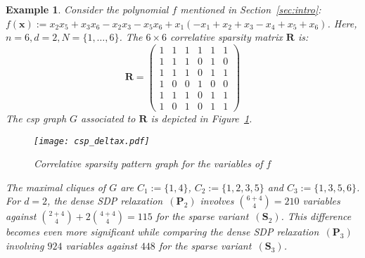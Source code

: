 \documentclass[preprint]{sigplanconf}
\newcommand{\x}{\mathbf{x}}
\def\P{\mathbf{P}}
\def\S{\mathbf{S}}
\def\S{\mathbf{S}}
\theoremstyle{plain}
\newtheorem{example}{Example}
\begin{document}
\begin{example}
\label{ex:sparse}
Consider the polynomial $f$ mentioned in Section~\ref{sec:intro}:
$f(\x) := x_2 x_5 + x_3 x_6 - x_2 x_3  - x_5 x_6 
+ x_1 ( - x_1 +  x_2 +  x_3  - x_4 +  x_5 +  x_6)$.
%
Here, $n = 6, d = 2, N = \{1,\dots, 6 \}$. The $6 \times 6$ correlative sparsity matrix $\mathbf{R}$ is:
\[
\mathbf{R} = 
\begin{pmatrix}
  1 & 1 & 1 & 1 & 1 & 1 \\
  1 & 1 & 1 & 0 & 1 & 0 \\
  1 & 1 & 1 & 0 & 1 & 1 \\
  1 & 0 & 0 & 1 & 0 & 0 \\
  1 & 1 & 1 & 0 & 1 & 1 \\
  1 & 0 & 1 & 0 & 1 & 1 
 \end{pmatrix}
\]
The csp graph $G$ associated to $\mathbf{R}$ is depicted in Figure~\ref{fig:csp_deltax}. 
%
\begin{figure}[!ht]	
\begin{center}
\texttt{[image: csp\_deltax.pdf]}
\caption{Correlative sparsity pattern graph for the variables of $f$}
\label{fig:csp_deltax}
\end{center}
\end{figure}
%
The maximal cliques of $G$ are $C_1 := \{1, 4\}$, $C_2 := \{1, 2, 3, 5\}$ and $C_3 := \{1, 3, 5, 6\}$. For $d=2$, the dense SDP relaxation~$(\P_2)$ involves $\binom{6 + 4}{4} = 210$ variables against $\binom{2 + 4}{4} + 2 \binom{4 + 4}{4} = 115$ for the sparse variant~$(\S_2)$. This difference becomes even more significant while comparing the dense SDP relaxation~$(\P_3)$ involving $924$ variables against $448$ for the sparse variant~$(\S_3)$.
\end{example}
%
\end{document}
